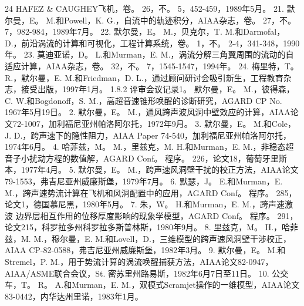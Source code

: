 \documentclass[UTF8,11pt,a4paper,openany,fontset=fandol]{ctexbook}
\begin{document}
24 HAFEZ \& CAUGHEY飞机，卷。 26，不。 5，452-459，1989年5月。 21. 默尔曼，E。 M.和Powell，K. G.，自流中的轨迹积分，AIAA杂志，卷。 27，不。 7，982-984，1989年7月。 22. 默尔曼，E。 M.，贝克尔，T. M.和Darmofal，D.，前沿涡流的计算和可视化，工程计算系统，卷。 1，不。 2-4，341-348，1990年。 23. 莫迪亚诺，D。 L.和Murman，E. M.，涡流分解三角翼周围的流动的自适应计算，AIAA杂志，卷。 32，不。 7，1545-1547，1994年。 24. 梅里特，T。 R.，默尔曼，E. M.和Friedman，D. L.，通过顾问研讨会吸引新生，工程教育杂志，接受出版，1997年1月。 1.8.2 评审会议记录1。 默尔曼，E。 M.，彼得森，C. W.和Bogdonoff，S. M.，高超音速锥形唤醒的诊断研究，AGARD CP No. 1967年5月19日。 2. 默尔曼，E。 M.，通风跨声波风洞中壁效应的计算，AIAA论文72-1007，加利福尼亚州帕洛阿尔托，1972年9月。 3. 默尔曼，E。 M.和Cole，J. D.，跨声速下的隐性阻力，AIAA Paper 74-540，加利福尼亚州帕洛阿尔托，1974年6月。 4. 哈菲兹，M。 M.，里兹克，M. H.和Murman，E. M.，非稳态超音子小扰动方程的数值解，AGARD Conf。 程序。 226，论文18，葡萄牙里斯本，1977年4月。 5. 默尔曼，E。 M.，跨声速风洞壁干扰的校正方法，AIAA论文79-1553，弗吉尼亚州威廉斯堡，1979年7月。 6. 默瑟，J。 E.和Murman，E. M.，跨声速势流计算在飞机和风洞配置中的应用，AGARD Conf。 程序。 285，论文1，德国慕尼黑，1980年5月。 7. 朱，W。 H.和Murman，E. M.，跨声速激波 边界层相互作用的位移厚度影响的现象学模型，AGARD Conf。 程序。 291，论文215，科罗拉多州科罗拉多斯普林斯，1980年9月。 8. 里兹克，M。 H.，哈菲兹，M. M.，穆尔曼，E. M.和Lovell，D.，三维模型的跨声速风洞壁干涉校正，AIAA CP-82-0588，弗吉尼亚州威廉斯堡，1982年3月。 9. 默尔曼，E。 M.和Stremel，P. M.，用于势流计算的涡流唤醒捕获方法，AIAA论文82-0947，AIAA/ASME联合会议，St. 密苏里州路易斯，1982年6月7日至11日。 10. 公交车，T。 R。 A.和Murman，E. M.，双模式Scramjet操作的一维模型，AIAA论文83-0442，内华达州里诺，1983年1月。
\end{document}
